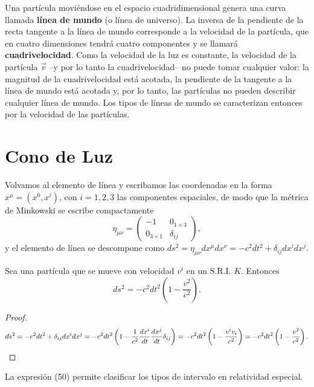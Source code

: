 Una partícula moviéndose en el espacio cuadridimensional genera una
curva llamada \textbf{línea de mundo} (o línea de universo). La
inversa de la pendiente de la recta tangente a la línea de mundo
corresponde a la velocidad de la partícula, que en cuatro dimensiones
tendrá cuatro componentes y se llamará \textbf{cuadrivelocidad}. Como la velocidad de la luz es constante, la
velocidad de la partícula $\vec v$ --y por lo tanto la cuadrivelocidad--
no puede tomar cualquier valor: la magnitud de la cuadrivelocidad está
acotada, la pendiente de la tangente a la línea de mundo está acotada
y, por lo tanto, las partículas no pueden describir cualquier línea de
mundo. Los tipos de
líneas de mundo se caracterizan entonces por la velocidad de las
partículas.

\section{Cono de Luz}

Volvamos al elemento de línea y escribamos las coordenadas en la forma
$x^\mu=(x^0,x^i)$, con $i=1,2,3$ las componentes espaciales, de modo que
la métrica de Minkowski se escribe compactamente
\[
\eta_{\mu\nu} = \begin{pmatrix} -1 & 0_{1\times3} \\ 0_{3\times1} &
\delta_{ij} \end{pmatrix}, \tag{49}
\]
y el elemento de línea se descompone como $ds^2=\eta_{\mu\nu}dx^\mu
dx^\nu = -c^2dt^2+\delta_{ij}dx^idx^j$.

\begin{proposicionc}
Sea una partícula que se mueve con velocidad $v^i$ en un S.R.I. $K$.
Entonces
\[
ds^2 = -c^2dt^2\left(1-\frac{v^2}{c^2}\right). \tag{50}
\]
\end{proposicionc}

\begin{proof}
\[
ds^2 = -c^2dt^2+\delta_{ij}dx^idx^j = -c^2dt^2\left(1-\frac{1}{c^2}
\frac{dx^i}{dt}\frac{dx^j}{dt}\delta_{ij}\right) = -c^2dt^2\left(1-
\frac{v^iv_i}{c^2}\right) = -c^2dt^2\left(1-\frac{v^2}{c^2}\right).
\qedhere
\]
\end{proof}

La expresión (50) permite clasificar los tipos de intervalo en
relatividad especial.

